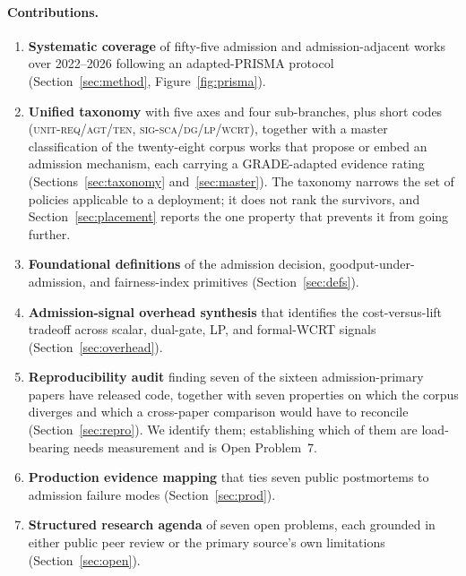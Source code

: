 \paragraph{Contributions.}
\begin{enumerate}[leftmargin=1.5em, itemsep=2pt]
\item \textbf{Systematic coverage} of fifty-five admission and
      admission-adjacent works over 2022--2026 following an
      adapted-PRISMA protocol (Section~\ref{sec:method},
      Figure~\ref{fig:prisma}).
\item \textbf{Unified taxonomy} with five axes and four sub-branches,
      plus short codes (\textsc{unit-req/agt/ten},
      \textsc{sig-sca/dg/lp/wcrt}), together with a master
      classification of the twenty-eight corpus works that propose or
      embed an admission mechanism, each carrying a GRADE-adapted
      evidence rating (Sections~\ref{sec:taxonomy}
      and~\ref{sec:master}). The taxonomy narrows the set of policies
      applicable to a deployment; it does not rank the survivors, and
      Section~\ref{sec:placement} reports the one property that
      prevents it from going further.
\item \textbf{Foundational definitions} of the admission decision,
      goodput-under-admission, and fairness-index primitives
      (Section~\ref{sec:defs}).
\item \textbf{Admission-signal overhead synthesis} that identifies the
      cost-versus-lift tradeoff across scalar, dual-gate, LP, and
      formal-WCRT signals (Section~\ref{sec:overhead}).
\item \textbf{Reproducibility audit} finding seven of the sixteen
      admission-primary papers have released code, together with seven
      properties on which the corpus diverges and which a cross-paper
      comparison would have to reconcile (Section~\ref{sec:repro}).
      We identify them; establishing which of them are load-bearing
      needs measurement and is Open Problem~7.
\item \textbf{Production evidence mapping} that ties seven public
      postmortems to admission failure modes (Section~\ref{sec:prod}).
\item \textbf{Structured research agenda} of seven open problems, each
      grounded in either public peer review or the primary source's
      own limitations (Section~\ref{sec:open}).
\end{enumerate}


